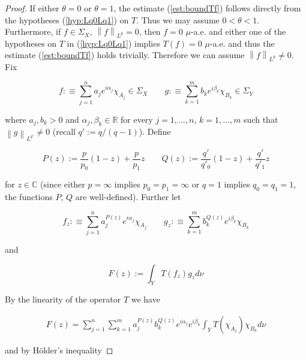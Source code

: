 \begin{proof}
	If either $\theta = 0$ or $\theta = 1$, the estimate (\ref{est:boundTf}) follows directly from the hypotheses (\ref{hyp:Lq0Lq1}) on $T$. Thus we may assume \underline{$0 < \theta < 1$}. Furthermore, if $f \in \Sigma_X$, $\left\| f \right\|_{L^p} = 0$, then $f = 0$ $\mu$-a.e. and either one of the hypotheses on $T$ in (\ref{hyp:Lq0Lq1}) implies $T(f) = 0$ $\mu$-a.e. and thus the estimate (\ref{est:boundTf}) holds trivially. Therefore we can assume \underline{$\left\| f\right\|_{L^p} \neq 0$}. Fix 
	
\begin{equation*}
	f :\equiv \sum_{j = 1}^n a_j e^{i\alpha_j}\chi_{A_j} \in \Sigma_X \qquad g :\equiv \sum_{k = 1}^m b_k e^{i\beta_k}\chi_{B_k} \in \Sigma_Y
\end{equation*}

where $a_j, b_k > 0$ and $\alpha_j, \beta_k \in \mathbb{R}$ for every $j = 1,\hdots,n$, $k = 1,\hdots,m$ such that $\left\| g\right\|_{L^{q'}} \neq 0$ (recall $q' := q/\left( q - 1 \right)$). Define

\begin{equation*}
	P(z) := \frac{p}{p_0}(1 - z) + \frac{p}{p_1}z \qquad Q(z) := \frac{q'}{q'_0}(1 - z) + \frac{q'}{q'_1}z
\end{equation*}

for $z \in \mathbb{C}$ (since either $p = \infty$ implies $p_0 = p_1 = \infty$ or $q = 1$ implies $q_0 = q_1 = 1$, the functions $P$, $Q$ are well-defined). Further let
				
\begin{equation}
	f_z :\equiv \sum_{j = 1}^n a^{P(z)}_j e^{i\alpha_j}\chi_{A_j} \qquad g_z :\equiv  \sum_{k = 1}^m b^{Q(z)}_k e^{i\beta_k}\chi_{B_k}
	\label{def:fzgz}
\end{equation}
				
and 

\begin{equation}
	F(z) := \int_Y T(f_z)g_zd\nu
	\label{eq:def_F}
\end{equation}

By the linearity of the operator $T$ we have

\begin{gather*}
	F(z) = \sum_{j = 1}^n\sum_{k = 1}^m a^{P(z)}_j b_k^{Q(z)} e^{i\alpha_j} e^{i\beta_k} \int_YT(\chi_{A_j})\chi_{B_k}d\nu
\end{gather*}

and by H\"older's inequality


\end{proof}
